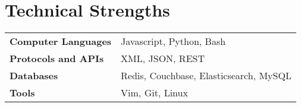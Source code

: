 \documentclass[a4paper,10pt]{article}
\begin{document}
\section{Technical Strengths}
\begin{tabular}{ll}
\textbf{Computer Languages} & Javascript, Python, Bash\\
\textbf{Protocols and APIs} & XML, JSON, REST\\
\textbf{Databases} & Redis, Couchbase, Elasticsearch, MySQL \\
\textbf{Tools} & Vim, Git, Linux
\end{tabular}
\end{document}
